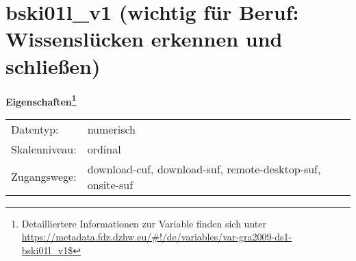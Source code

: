 
    \setcounter{footnote}{0}

    \vspace*{-1.8cm}
	\section{bski01l\_v1 (wichtig für Beruf: Wissenslücken erkennen und schließen)}
	\label{section:bski01l_v1}



    \vspace*{0.5cm}
    \noindent\textbf{Eigenschaften\footnote{Detailliertere Informationen zur Variable finden sich unter
		\url{https://metadata.fdz.dzhw.eu/\#!/de/variables/var-gra2009-ds1-bski01l_v1$}}}\\
	\begin{tabularx}{\hsize}{@{}lX}
	Datentyp: & numerisch \\
	Skalenniveau: & ordinal \\
	Zugangswege: &
	  download-cuf, 
	  download-suf, 
	  remote-desktop-suf, 
	  onsite-suf
 \\
    \end{tabularx}



